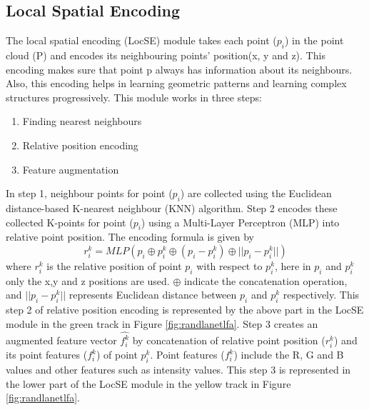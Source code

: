 \subsection{Local Spatial Encoding}
The local spatial encoding (LocSE) module takes each point ($p_i$) in the point cloud (P) and encodes its neighbouring points' position(x, y and z).
This encoding makes sure that point p always has information about its neighbours.
Also, this encoding helps in learning geometric patterns and learning complex structures progressively.
This module works in three steps:
\begin{enumerate}
    \item Finding nearest neighbours
    \item Relative position encoding
    \item Feature augmentation
\end{enumerate}

In step 1, neighbour points for point ($p_i$) are collected using the Euclidean distance-based K-nearest neighbour (KNN) algorithm.
Step 2 encodes these collected K-points for point ($p_i$) using a Multi-Layer Perceptron (MLP) into relative point position. The encoding formula is given by
$$
r_i^k = MLP(p_i \oplus p_i^k \oplus (p_i - p_i^k) \oplus ||p_i-p_i^k||)
$$
where $r_i^k$ is the relative position of point $p_i$ with respect to $p_i^k$, here in $p_i$ and $p_i^k$ only the x,y and z positions are used.
$\oplus$ indicate the concatenation operation, and $||p_i-p_i^k||$ represents Euclidean distance between $p_i$ and $p_i^k$ respectively.
This step 2 of relative position encoding is represented by the above part in the LocSE module in the green track in Figure \ref{fig:randlanetlfa}.
Step 3 creates an augmented feature vector $\hat{f_i^k}$ by concatenation of relative point position ($r_i^k$) and its point features ($f_i^k$) of point $p_i^k$.
Point features ($f_i^k$) include the R, G and B values and other features such as intensity values.
This step 3 is represented in the lower part of the LocSE module in the yellow track in Figure \ref{fig:randlanetlfa}.
